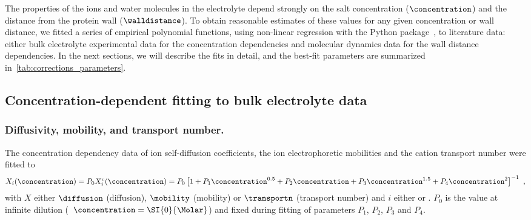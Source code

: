 The properties of the ions and water molecules in the electrolyte depend strongly on the salt concentration
($\concentration$) and the distance from the protein wall ($\walldistance$). To obtain reasonable estimates of
these values for any given  concentration or wall distance, we fitted a series of empirical
polynomial functions, using non-linear regression with the  Python package~\cite{Newville-2014},
to literature data: either bulk electrolyte experimental data for the concentration dependencies and molecular
dynamics data for the wall distance dependencies. In the next sections, we will describe the fits in detail,
and the best-fit parameters are summarized in~\cref{tab:corrections_parameters}.

%
\subsection{Concentration-dependent fitting to bulk electrolyte data}
%

\subsubsection{Diffusivity, mobility, and transport number.}
%
The  concentration dependency data of ion self-diffusion coefficients, the ion electrophoretic
mobilities and the cation transport number were fitted to
%
\begin{align}\label{eq:concentration_d_mu_tna}
  X_{i} (\concentration) = P_0 X_{i}^c (\concentration) =
  P_0 \left[ 1
           + P_1 \concentration^{0.5}
           + P_2 \concentration
           + P_3 \concentration^{1.5}
           + P_4 \concentration^2 
      \right]^{-1}
  \text{ ,}
\end{align}
%
with $X$ either $\diffusion$ (diffusion), $\mobility$ (mobility) or $\transportn$ (transport number) and $i$
either \Na{} or \Cl{}. $P_0$ is the value at infinite dilution (\ie~$\concentration = \SI{0}{\Molar}$) and
fixed during fitting of parameters $P_1$, $P_2$, $P_3$ and $P_4$.

